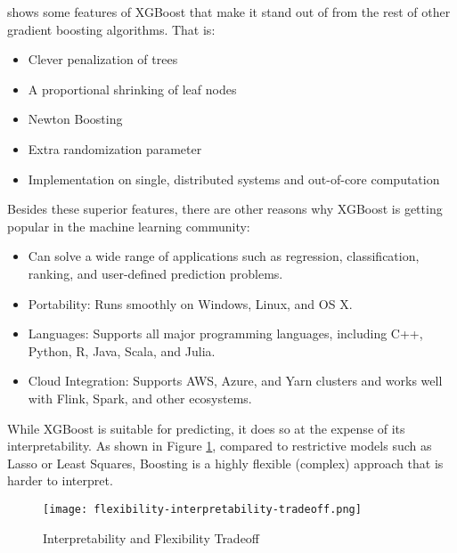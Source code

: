 \textcite{nielsen2016tree} shows some features of XGBoost that make it stand out
of from the rest of other gradient boosting algorithms. That is:
\begin{itemize}
    \item Clever penalization of trees
    \item A proportional shrinking of leaf nodes
    \item Newton Boosting
    \item Extra randomization parameter
    \item Implementation on single, distributed systems and out-of-core computation
\end{itemize}
Besides these superior features, there are other reasons why XGBoost is getting
popular in the machine learning community:
\begin{itemize}
    \item Can solve a wide range of applications such as regression,
        classification, ranking, and user-defined prediction problems.
    \item Portability: Runs smoothly on Windows, Linux, and OS X.
    \item Languages: Supports all major programming languages, including C++,
        Python, R, Java, Scala, and Julia.
    \item Cloud Integration: Supports AWS, Azure, and Yarn clusters and works
        well with Flink, Spark, and other ecosystems.
\end{itemize}


While XGBoost is suitable for predicting, it does so at the expense of its
interpretability.  As shown in Figure
\ref{fig:flexibility-interpretability-tradeoff}, compared to restrictive models
such as Lasso or Least Squares, Boosting is a highly flexible (complex) approach
that is harder to interpret.

\begin{figure}[H]\centering
    \texttt{[image: flexibility-interpretability-tradeoff.png]}
    \caption{Interpretability and Flexibility Tradeoff}
    \label{fig:flexibility-interpretability-tradeoff}
\end{figure}
